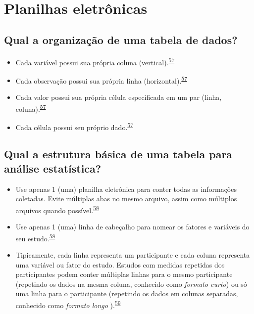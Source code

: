 \documentclass[
]{book}
\begin{document}
\hypertarget{planilhas}{%
\section{Planilhas eletrônicas}\label{planilhas}}

\hypertarget{qual-a-organizauxe7uxe3o-de-uma-tabela-de-dados}{%
\subsection{Qual a organização de uma tabela de dados?}\label{qual-a-organizauxe7uxe3o-de-uma-tabela-de-dados}}

\begin{itemize}
\item
  Cada variável possui sua própria coluna (vertical).\textsuperscript{\protect\hyperlink{ref-tierney2023}{57}}
\item
  Cada observação possui sua própria linha (horizontal).\textsuperscript{\protect\hyperlink{ref-tierney2023}{57}}
\item
  Cada valor possui sua própria célula especificada em um par (linha, coluna).\textsuperscript{\protect\hyperlink{ref-tierney2023}{57}}
\item
  Cada célula possui seu próprio dado.\textsuperscript{\protect\hyperlink{ref-tierney2023}{57}}
\end{itemize}

\hypertarget{qual-a-estrutura-buxe1sica-de-uma-tabela-para-anuxe1lise-estatuxedstica}{%
\subsection{Qual a estrutura básica de uma tabela para análise estatística?}\label{qual-a-estrutura-buxe1sica-de-uma-tabela-para-anuxe1lise-estatuxedstica}}

\begin{itemize}
\item
  Use apenas 1 (uma) planilha eletrônica para conter todas as informações coletadas. Evite múltiplas abas no mesmo arquivo, assim como múltiplos arquivos quando possível.\textsuperscript{\protect\hyperlink{ref-broman2018}{58}}
\item
  Use apenas 1 (uma) linha de cabeçalho para nomear os fatores e variáveis do seu estudo.\textsuperscript{\protect\hyperlink{ref-broman2018}{58}}
\item
  Tipicamente, cada linha representa um participante e cada coluna representa uma variável ou fator do estudo. Estudos com medidas repetidas dos participantes podem conter múltiplas linhas para o mesmo participante (repetindo os dados na mesma coluna, conhecido como \emph{formato curto}) ou só uma linha para o participante (repetindo os dados em colunas separadas, conhecido como \emph{formato longo} ).\textsuperscript{\protect\hyperlink{ref-Juluru2015}{59}}
\end{itemize}
\end{document}

